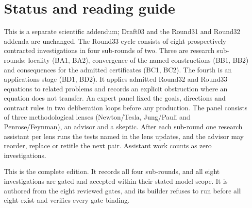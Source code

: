\documentclass[11pt,a4paper]{article}
\begin{document}
\section*{Status and reading guide}
This is a separate scientific addendum; Draft03 \cite{draft03} and the Round31
and Round32 addenda \cite{r31add,r32add} are unchanged. The Round33 cycle consists of eight prospectively
contracted investigations in four sub-rounds of two. Three are research
sub-rounds: locality (BA1, BA2), convergence of the named constructions (BB1,
BB2) and consequences for the admitted certificates (BC1, BC2). The fourth is
an applications stage (BD1, BD2). It applies admitted Round32 and Round33
equations to related problems and records an explicit obstruction where an
equation does not transfer. An expert panel fixed the goals, directions and
contract rules in two deliberation loops before any production. The panel
consists of three methodological lenses (Newton/Tesla, Jung/Pauli and
Penrose/Feynman), an advisor and a skeptic. After each sub-round one research
assistant per lens runs the tests named in the lens updates, and the advisor
may reorder, replace or retitle the next pair. Assistant work counts as zero
investigations.

This is the complete edition. It records all four sub-rounds, and all eight
investigations are gated and accepted within their stated model scope. It is
authored from the eight reviewed gates, and its builder refuses to run before
all eight exist and verifies every gate binding.
\end{document}
